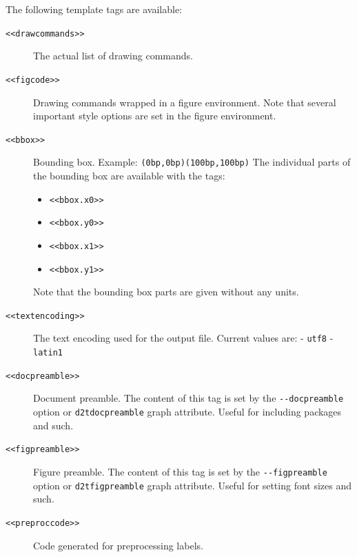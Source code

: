\documentclass[10pt,a4paper,english]{article}
\begin{document}
The following template tags are available:
\begin{description}
\item[{\texttt{<{}<drawcommands>{}>}}] \leavevmode 
The actual list of drawing commands.

\item[{\texttt{<{}<figcode>{}>}}] \leavevmode 
Drawing commands wrapped in a figure environment. Note that several important style options are set in the figure environment.

\item[{\texttt{<{}<bbox>{}>}}] \leavevmode 
Bounding box. Example: \texttt{(0bp,0bp)(100bp,100bp)}
The individual parts of the bounding box are available with the tags:
\begin{itemize}
\item {} 
\texttt{<{}<bbox.x0>{}>}

\item {} 
\texttt{<{}<bbox.y0>{}>}

\item {} 
\texttt{<{}<bbox.x1>{}>}

\item {} 
\texttt{<{}<bbox.y1>{}>}

\end{itemize}

Note that the bounding box parts are given without any units.

\item[{\texttt{<{}<textencoding>{}>}}] \leavevmode 
The text encoding used for the output file. Current values are:
- \texttt{utf8}
- \texttt{latin1}

\item[{\texttt{<{}<docpreamble>{}>}}] \leavevmode 
Document preamble. The content of this tag is set by the \texttt{-{}-docpreamble} option or \texttt{d2tdocpreamble} graph attribute. Useful for including packages and such.

\item[{\texttt{<{}<figpreamble>{}>}}] \leavevmode 
Figure preamble. The content of this tag is set by the \texttt{-{}-figpreamble} option or \texttt{d2tfigpreamble} graph attribute. Useful for setting font sizes and such.

\item[{\texttt{<{}<preproccode>{}>}}] \leavevmode 
Code generated for preprocessing labels.

\end{description}
\end{document}
